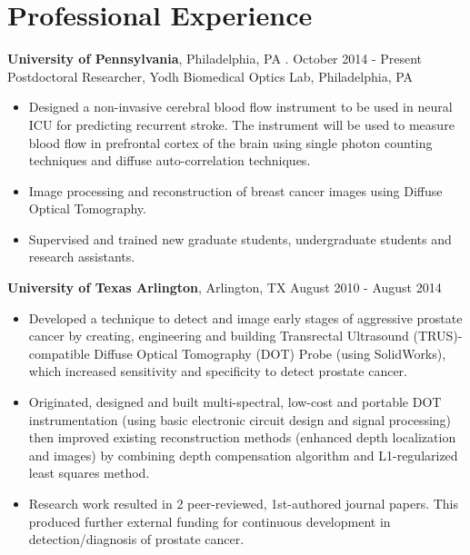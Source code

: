 \documentclass{my_cv}
\begin{document}
\vspace{-7mm}%


\section{Professional Experience}
\begin{flushleft}  

\textbf{University of Pennsylvania}, Philadelphia, PA . \hfill October 2014 - Present \\ 
Postdoctoral Researcher, Yodh Biomedical Optics Lab, Philadelphia, PA
\vspace{-2mm}
\begin{itemize} \itemsep -2pt %
\item Designed a non-invasive cerebral blood flow instrument to be used in neural ICU for predicting recurrent stroke. The instrument will be used to measure blood flow in prefrontal cortex of the brain using single photon counting techniques and diffuse auto-correlation techniques. 
\item Image processing and reconstruction of breast cancer images using Diffuse Optical Tomography.
\item Supervised and trained new graduate students, undergraduate students and research assistants.  
\end{itemize}

\textbf{University of Texas Arlington}, Arlington, TX \hfill August 2010 - August 2014 \\ 
\begin{itemize} \itemsep -2pt %
\vspace{-2mm}
\item Developed a technique to detect and image early stages of aggressive prostate cancer by creating, engineering and building Transrectal Ultrasound (TRUS)-compatible Diffuse Optical Tomography (DOT) Probe (using SolidWorks), which increased sensitivity and specificity to detect prostate cancer. 

\item Originated, designed and built multi-spectral, low-cost and portable DOT instrumentation (using basic electronic circuit design and signal processing) then improved existing reconstruction methods (enhanced depth localization and images) by combining depth compensation algorithm and L1-regularized least squares method.

\item Research work resulted in 2 peer-reviewed, 1st-authored journal papers. This produced further external funding for continuous development in detection/diagnosis of prostate cancer.

\end{itemize}
\end{flushleft}
 
\end{document}
